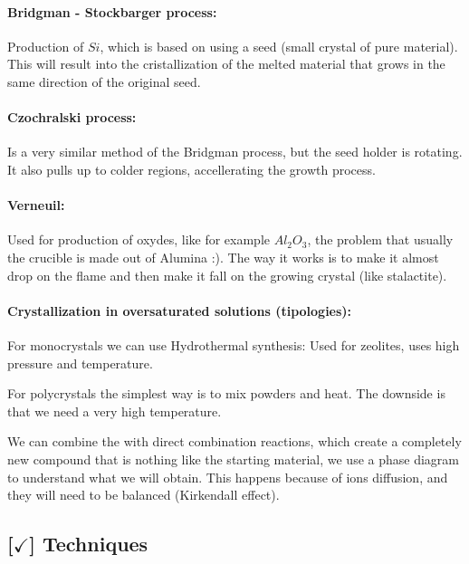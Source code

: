 \paragraph{Bridgman - Stockbarger process: }

Production of $Si$, which is based on using a seed (small crystal of pure material). This will result into the cristallization of the melted material that grows in the same direction of the original seed.

\paragraph{Czochralski process: }

Is a very similar method of the Bridgman process, but the seed holder is rotating. It also pulls up to colder regions, accellerating the growth process.

\paragraph{Verneuil: }

Used for production of oxydes, like for example $Al_2O_3$, the problem that usually the crucible is made out of Alumina :). The way it works is to make it almost drop on the flame and then make it fall on the growing crystal (like stalactite).

\paragraph{Crystallization in oversaturated solutions (tipologies): }

For monocrystals we can use Hydrothermal synthesis: Used for zeolites, uses high pressure and temperature.

\vspace{15pt}

\noindent For polycrystals the simplest way is to mix powders and heat. The downside is that we need a very high temperature.

\vspace{15pt}

\noindent We can combine the with direct combination reactions, which create a completely new compound that is nothing like the starting material, we use a phase diagram to understand what we will obtain. This happens because of ions diffusion, and they will need to be balanced (Kirkendall effect).

\subsection{[$\checkmark$] Techniques}

